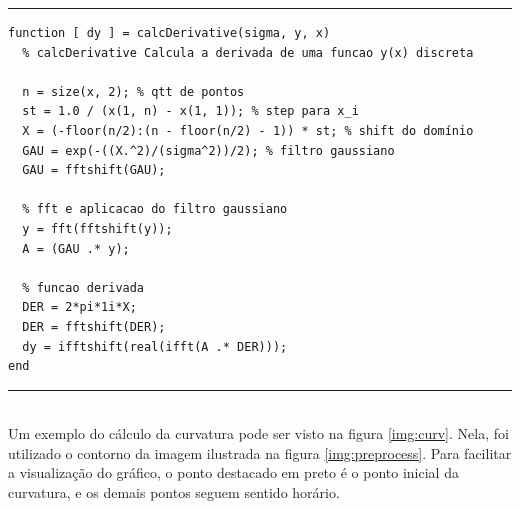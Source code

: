 \noindent\rule{0.95 \textwidth}{1.pt}
\vspace{-0.2cm}
\begin{verbatim}
function [ dy ] = calcDerivative(sigma, y, x)
  % calcDerivative Calcula a derivada de uma funcao y(x) discreta
  
  n = size(x, 2); % qtt de pontos
  st = 1.0 / (x(1, n) - x(1, 1)); % step para x_i
  X = (-floor(n/2):(n - floor(n/2) - 1)) * st; % shift do domínio
  GAU = exp(-((X.^2)/(sigma^2))/2); % filtro gaussiano
  GAU = fftshift(GAU);

  % fft e aplicacao do filtro gaussiano
  y = fft(fftshift(y));
  A = (GAU .* y);

  % funcao derivada
  DER = 2*pi*1i*X;
  DER = fftshift(DER);
  dy = ifftshift(real(ifft(A .* DER)));
end
\end{verbatim}
\vspace{-0.5cm}
\noindent\rule{0.95 \textwidth}{1.pt}\\

Um exemplo do cálculo da curvatura pode ser visto na figura \ref{img:curv}. Nela, foi utilizado o contorno da imagem ilustrada na figura \ref{img:preprocess}. Para facilitar a visualização do gráfico, o ponto destacado em preto é o ponto inicial da curvatura, e os demais pontos seguem sentido horário.

